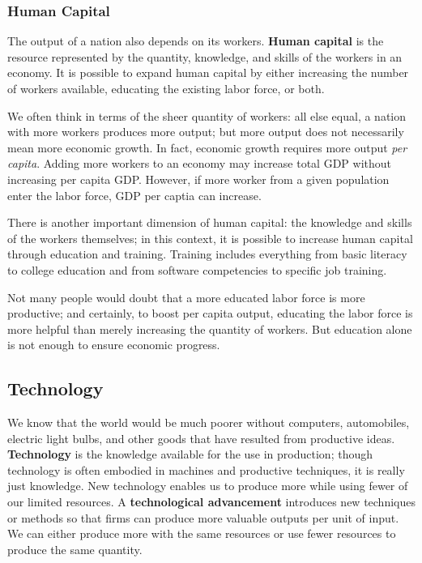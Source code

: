 \documentclass[11pt]{article} %
\begin{document}
\subsubsection*{Human Capital}
The output of a nation also depends on its workers. \textbf{Human capital} is the resource represented by the quantity, knowledge, and skills of the workers in an economy. It is possible to expand human capital by either increasing the number of workers available, educating the existing labor force, or both.

We often think in terms of the sheer quantity of workers: all else equal, a nation with more workers produces more output; but more output does not necessarily mean more economic growth. In fact, economic growth requires more output \textit{per capita}. Adding more workers to an economy may increase total GDP without increasing per capita GDP. However, if more worker from a given population enter the labor force, GDP per captia can increase.

There is another important dimension of human capital: the knowledge and skills of the workers themselves; in this context, it is possible to increase human capital through education and training. Training includes everything from basic literacy to college education and from software competencies to specific job training.

Not many people would doubt that a more educated labor force is more productive; and certainly, to boost per capita output, educating the labor force is more helpful than merely increasing the quantity of workers. But education alone is not enough to ensure economic progress.

\subsection*{Technology}

We know that the world would be much poorer without computers, automobiles, electric light bulbs, and other goods that have resulted from productive ideas. \textbf{Technology} is the knowledge available for the use in production; though technology is often embodied in machines and productive techniques, it is really just knowledge. New technology enables us to produce more while using fewer of our limited resources. A \textbf{technological advancement} introduces new techniques or methods so that firms can produce more valuable outputs per unit of input. We can either produce more with the same resources or use fewer resources to produce the same quantity.
\end{document}
